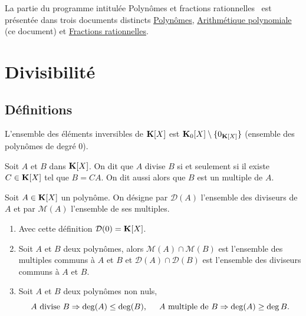 

La partie du programme intitulée \og Polynômes et fractions rationnelles\fg~ est présentée dans trois documents distincts \href{\baseurl C1622.pdf}{Polynômes}, \href{\baseurl C2160.pdf}{Arithmétique polynomiale} (ce document)  et \href{\baseurl C1623.pdf}{Fractions rationnelles}.

\section{Divisibilité}
\subsection{Définitions}
\begin{prop}[Inversibles]
 L'ensemble des éléments inversibles de $\mathbf{K}[X]$ est $\mathbf{K}_0[X]\setminus\{0_{\mathbf{K}[X]}\}$ (ensemble des polynômes de degré $0$).
\end{prop}
\begin{defi}
 Soit $A$ et $B$ dans $\mathbf{K}[X]$. On dit que $A$ divise $B$ si et seulement si il existe $C\in \mathbf{K}[X]$ tel que $B=CA$. On dit aussi alors que $B$ est un multiple de $A$. 
\end{defi}
\begin{nota}
  Soit $A\in \mathbf{K}[X]$ un polynôme. On désigne par $\mathcal D (A)$ l'ensemble des diviseurs de $A$ et par $\mathcal M (A)$ l'ensemble de ses multiples. 
\end{nota}
\begin{rems}
\begin{enumerate}
 \item Avec cette définition $\mathcal{D}(0) = \mathbf{K}[X]$.
 \item Soit $A$ et $B$ deux polynômes, alors $\mathcal M (A)\cap \mathcal M (B)$ est l'ensemble des multiples communs à $A$ et $B$ et $\mathcal D (A)\cap \mathcal D (B)$ est l'ensemble des diviseurs communs à $A$ et $B$. 
 \item Soit $A$ et $B$ deux polynômes non nuls,
\[
 A \text{ divise } B \Rightarrow \deg(A) \leq \deg(B), \hspace{0.5cm} A \text{ multiple de } B \Rightarrow \deg(A) \geq \deg B. 
\]
\end{enumerate} 
\end{rems}

